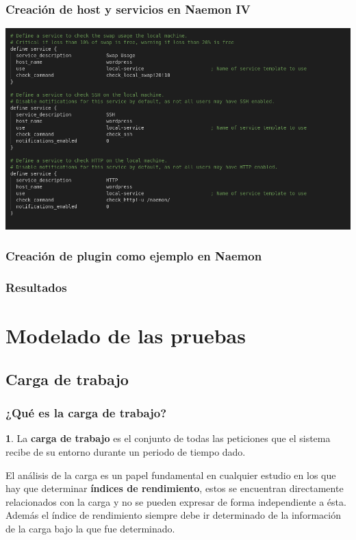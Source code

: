 \documentclass{beamer}
\theoremstyle{plain}
\theoremstyle{definition}
\newtheorem{defn}[thm]{}
\theoremstyle{plain}
\theoremstyle{definition}
\theoremstyle{remark}
\theoremstyle{definition}
\begin{document}
\begin{frame}
	\frametitle{Creación de host y servicios en Naemon IV}
	
	
	\centering
	\includegraphics[scale=0.25]{imagenes/analisis_naemon/services2.png}
	
\end{frame}
\begin{frame}
	\frametitle{Creación de plugin como ejemplo en Naemon}
	
\end{frame}
\begin{frame}
	\frametitle{Resultados}
	\end{frame}


\section{Modelado de las pruebas} %
\subsection{Carga de trabajo}
\begin{frame}
	\frametitle{¿Qué es la carga de trabajo?}
	\begin{defn}
		La \textbf{carga de trabajo} es el conjunto de todas las peticiones que el sistema recibe de su entorno
		durante un periodo de tiempo dado.
	\end{defn}
El análisis de la carga es un papel fundamental en cualquier
estudio en los que hay que determinar \textbf{índices de rendimiento}, estos se
encuentran directamente relacionados con la carga y no se pueden expresar
de forma independiente a ésta. Además el índice de rendimiento siempre debe
ir determinado de la información de la carga bajo la que fue determinado.
	
\end{frame}
\end{document}
